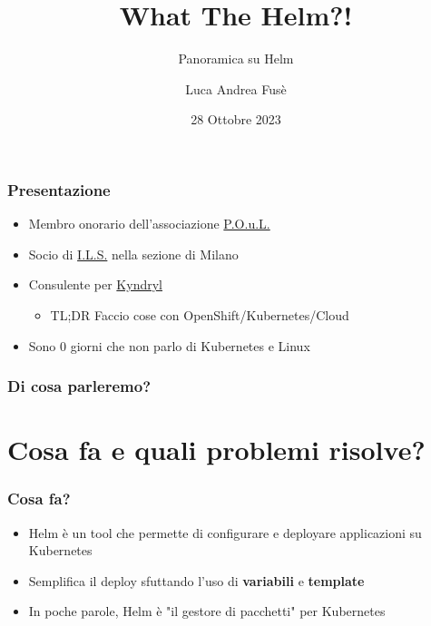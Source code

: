 \documentclass{beamer}
\title{What The Helm?!}
\subtitle{Panoramica su Helm}
\author{Luca Andrea Fusè}
\date{28 Ottobre 2023}
\begin{document}
\renewcommand{\CancelColor}{\color{red}}

\begin{frame}
    \titlepage
\end{frame}
 
 \begin{frame}
     \frametitle{Presentazione}

    \begin{itemize}
        \item Membro onorario dell'associazione \href{https://www.poul.org}{P.O.u.L.}
        \item Socio di \href{https://www.ils.org}{I.L.S.} nella sezione di Milano
        \item Consulente per \href{https://www.kyndryl.com}{Kyndryl}
        \begin{itemize}\item TL;DR Faccio cose con OpenShift/Kubernetes/Cloud \end{itemize}
        \item Sono 0 giorni che non parlo di Kubernetes e Linux
    \end{itemize}
 \end{frame}
 
 \begin{frame}
   \frametitle{Di cosa parleremo?}
   \tableofcontents
   
  \end{frame}
  
\section{Cosa fa e quali problemi risolve?}
\begin{frame}
\frametitle{Cosa fa?}
 \begin{itemize}
    \item Helm è un tool che permette di configurare e deployare applicazioni su Kubernetes
    \item Semplifica il deploy sfuttando l'uso di \textbf{variabili} e \textbf{template}
    \item In poche parole, Helm è "il gestore di pacchetti" per Kubernetes
  \end{itemize}
\end{frame}
\end{document}
